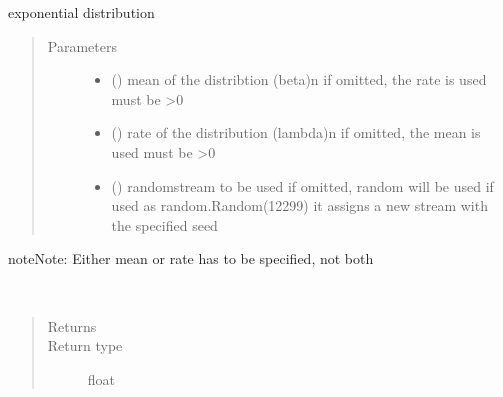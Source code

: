 \documentclass[letterpaper,10pt,english]{sphinxmanual}
\begin{document}

\begin{fulllineitems}
\label{\detokenize{Reference:salabim.Exponential}}
exponential distribution
\begin{quote}\begin{description}
\item[{Parameters}] \leavevmode\begin{itemize}
\item {} 
 () \textendash{} mean of the distribtion (beta)\textbar{}n\textbar{}
if omitted, the rate is used 
must be \textgreater{}0

\item {} 
 () \textendash{} rate of the distribution (lambda)\textbar{}n\textbar{}
if omitted, the mean is used 
must be \textgreater{}0

\item {} 
 () \textendash{} randomstream to be used 
if omitted, random will be used 
if used as random.Random(12299)
it assigns a new stream with the specified seed

\end{itemize}

\end{description}\end{quote}

\begin{sphinxadmonition}{note}{Note:}
Either mean or rate has to be specified, not both
\end{sphinxadmonition}

\begin{fulllineitems}
\label{\detokenize{Reference:salabim.Exponential.mean}}~\begin{quote}\begin{description}
\item[{Returns}] \leavevmode
{}

\item[{Return type}] \leavevmode
float


\end{description}
\end{quote}
\end{fulllineitems}
\end{fulllineitems}
\end{document}
